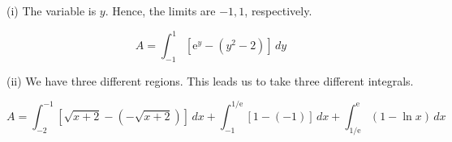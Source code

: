 \documentclass{article}
\begin{document}
\hfill

\noindent (i) The variable is $y$. Hence, the limits are $-1, 1$, respectively.

\begin{equation*}
A = \int_{-1}^1\left[ \mathrm{e}^y - (y^2-2) \right] \,dy
\end{equation*}

\hfill

\noindent (ii) We have three different regions. This leads us to take three different integrals.

\begin{equation*}
A = \int_{-2}^{-1}\left[ \sqrt{x+2} - (-\sqrt{x+2}) \right] \,dx +\int_{-1}^{1/\mathrm{e}}\left[1-(-1) \right] \,dx + \int_{1/\mathrm{e}}^{\mathrm{e}}\left(1 -\ln x \right) \,dx
\end{equation*}
\end{document}
